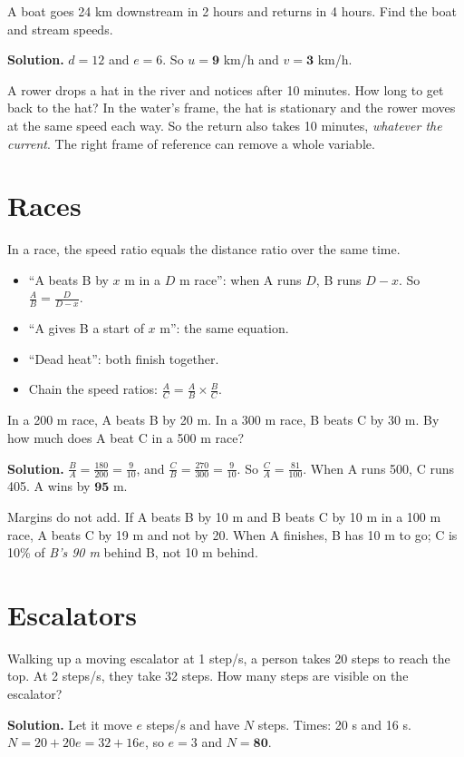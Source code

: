 \documentclass[11pt,a4paper,openany]{report}
\begin{document}
\begin{example}
A boat goes 24 km downstream in 2 hours and returns in 4 hours. Find the boat and stream speeds.

\textbf{Solution.} $d=12$ and $e=6$. So $u=\mathbf{9}$ km/h and $v=\mathbf{3}$ km/h.
\end{example}

\begin{why}
A rower drops a hat in the river and notices after 10 minutes. How long to get back to the hat? In the water's frame, the hat is stationary and the rower moves at the same speed each way. So the return also takes 10 minutes, \emph{whatever the current}. The right frame of reference can remove a whole variable.
\end{why}

\section{Races}
In a race, the speed ratio equals the distance ratio over the same time.
\begin{itemize}[nosep]
\item ``A beats B by $x$ m in a $D$ m race'': when A runs $D$, B runs $D-x$. So $\frac AB=\frac{D}{D-x}$.
\item ``A gives B a start of $x$ m'': the same equation.
\item ``Dead heat'': both finish together.
\item Chain the speed ratios: $\frac AC=\frac AB\times\frac BC$.
\end{itemize}

\begin{example}
In a 200 m race, A beats B by 20 m. In a 300 m race, B beats C by 30 m. By how much does A beat C in a 500 m race?

\textbf{Solution.} $\frac BA=\frac{180}{200}=\frac9{10}$, and $\frac CB=\frac{270}{300}=\frac9{10}$. So $\frac CA=\frac{81}{100}$. When A runs 500, C runs 405. A wins by $\mathbf{95}$ m.
\end{example}

\begin{trap}
Margins do not add. If A beats B by 10 m and B beats C by 10 m in a 100 m race, A beats C by 19 m and not by 20. When A finishes, B has 10 m to go; C is 10\% of \emph{B's 90 m} behind B, not 10 m behind.
\end{trap}

\section{Escalators}
\begin{example}
Walking up a moving escalator at 1 step/s, a person takes 20 steps to reach the top. At 2 steps/s, they take 32 steps. How many steps are visible on the escalator?

\textbf{Solution.} Let it move $e$ steps/s and have $N$ steps. Times: 20 s and 16 s. $N=20+20e=32+16e$, so $e=3$ and $N=\mathbf{80}$.
\end{example}
\end{document}
